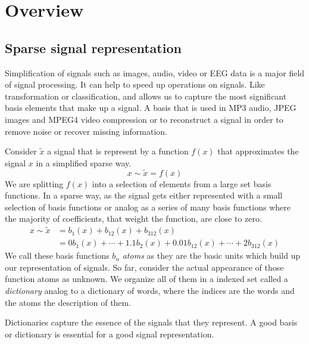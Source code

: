 \chapter{Overview}

\section{Sparse signal representation}
\label{sec:dicts}
Simplification of signals such as images, audio, video or EEG data is a major
field of signal processing. It can help to speed up operations on signals. Like
transformation or classification, and allows us to capture the most
significant basis elements that make up a signal. A basis that is
used in MP3 audio, JPEG images and MPEG4 video compression or to reconstruct
a signal in order to remove noise or recover missing information.

Consider $\tilde{x}$ a signal that is represent by a function $f(x)$ that
approximates
the signal $x$ in a simplified sparse way.
\begin{equation*}
x \sim \tilde{x} = f\left(x\right)
\end{equation*}
We are splitting $f(x)$ into a selection of elements from a large set
basis functions. In a sparse way, as the signal gets either represented with
a small selection of basis functions or analog as a series of many basis
functions where the majority of coefficients, that weight the function, are
close to zero. 
\begin{equation*}
\begin{split}
x \sim \tilde{x} & = b_{1}(x) + b_{12}(x) + b_{312}(x)\\
& = 0b_{1}(x) + \cdots + 1.1b_{2}(x) + 0.01b_{12}(x) + \cdots +
2b_{312}(x)
\end{split}
\end{equation*}
We call these basis functions $b_n$ \emph{atoms} as they are the basic units
which build up our representation of signals. So far, consider the actual
appearance of those function atoms as unknown. We organize all of them in a
indexed set called a \emph{dictionary} analog to a dictionary of words, where
the indices are the words and the atoms the description of them. 

Dictionaries capture the essence of the signals that they represent.
A good basis or dictionary is essential for a good signal representation.

